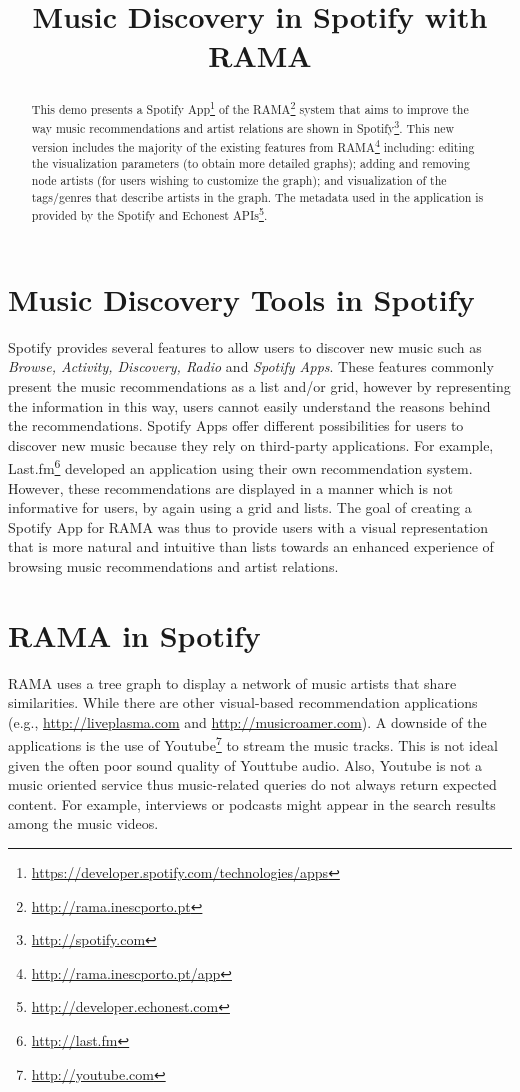 \documentclass{article}
\title{Music Discovery in Spotify with RAMA}
\begin{document}
\maketitle

\begin{abstract}
  This demo presents a Spotify App\footnote{\url{https://developer.spotify.com/technologies/apps}} of the RAMA\footnote{\url{http://rama.inescporto.pt}} system that aims to improve the way music recommendations and artist relations are shown in Spotify\footnote{\url{http://spotify.com}}.  This new version includes the majority of the existing features from RAMA\footnote{\url{http://rama.inescporto.pt/app}} including: editing the visualization parameters (to obtain more detailed graphs); adding and removing node artists (for users wishing to customize the graph); and visualization of the tags/genres that describe artists in the graph.
  The metadata used in the application is provided by the Spotify and Echonest APIs\footnote{\url{http://developer.echonest.com}}.
\end{abstract}

  \section{Music Discovery Tools in Spotify}
  \label{sec:spotify_tools}

    Spotify provides several features to allow users to discover new music such as \textit{Browse, Activity, Discovery, Radio} and \textit{Spotify Apps}.
    These features commonly present the music recommendations as a list and/or grid, however by representing the information in this way, users cannot easily understand the reasons behind the recommendations. 
    Spotify Apps offer different possibilities for users to discover new music because they rely on third-party applications. For example, Last.fm\footnote{\url{http://last.fm}} developed an application using their own recommendation system.
    However, these recommendations are displayed in a manner which is not informative for users, by again using a grid and lists. 
    The goal of creating a Spotify App for RAMA was thus to provide users with a visual representation that is more natural and intuitive than lists towards an enhanced experience of browsing music recommendations and artist relations. 

  \section{RAMA in Spotify}
  \label{sec:rama}
    \sloppy
    RAMA uses a tree graph to display a network of music artists that share similarities.
    While there are other visual-based recommendation applications (e.g., \url{http://liveplasma.com} and \url{http://musicroamer.com}).
    A downside of the applications is the use of Youtube\footnote{\url{http://youtube.com}} to stream the music tracks.
    This is not ideal given the often poor sound quality of Youttube audio. Also, Youtube is not a music oriented service thus music-related queries do not always return expected content. For example, interviews or podcasts might appear in the search results among the music videos.
\end{document}
